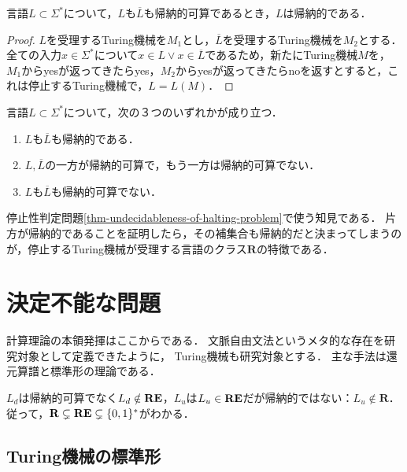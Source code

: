 \documentclass[uplatex, dvipdfmx]{jsreport}
\begin{document}
\begin{proposition}
    言語$L\subset\Sigma^*$について，$L$も$\overline{L}$も帰納的可算であるとき，$L$は帰納的である．
\end{proposition}
\begin{proof}
    $L$を受理するTuring機械を$M_1$とし，$\overline{L}$を受理するTuring機械を$M_2$とする．
    全ての入力$x\in\Sigma^*$について$x\in L\lor x\in\overline{L}$であるため，新たにTuring機械$M$を，
    $M_1$からyesが返ってきたらyes，$M_2$からyesが返ってきたらnoを返すとすると，これは停止するTuring機械で，$L=L(M)$．
\end{proof}

\begin{theorem}\label{thm-language-classification}
    言語$L\subset\Sigma^*$について，次の３つのいずれかが成り立つ．
    \begin{enumerate}
        \item $L$も$\overline{L}$も帰納的である．
        \item $L,\overline{L}$の一方が帰納的可算で，もう一方は帰納的可算でない．
        \item $L$も$\overline{L}$も帰納的可算でない．
    \end{enumerate}
\end{theorem}
\begin{remarks}
    停止性判定問題\ref{thm-undecidableness-of-halting-problem}で使う知見である．
    片方が帰納的であることを証明したら，その補集合も帰納的だと決まってしまうのが，停止するTuring機械が受理する言語のクラス$\mathbf{R}$の特徴である．
\end{remarks}

\section{決定不能な問題}\label{sec-undecidable-problems}

\begin{tcolorbox}[colframe=ForestGreen, colback=ForestGreen!10!white, breakable]
    計算理論の本領発揮はここからである．
    文脈自由文法というメタ的な存在を研究対象として定義できたように，
    Turing機械も研究対象とする．
    主な手法は還元算譜と標準形の理論である．

    $L_d$は帰納的可算でなく$L_d\notin\mathbf{RE}$，$L_u$は$L_u\in\mathbf{RE}$だが帰納的ではない：$L_u\notin\mathbf{R}$．
    従って，$\mathbf{R}\subsetneq\mathbf{RE}\subsetneq\{0,1\}^*$がわかる．
\end{tcolorbox}

\subsection{Turing機械の標準形}
\end{document}
